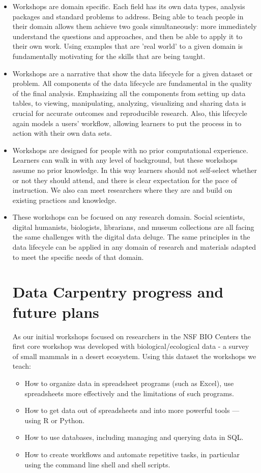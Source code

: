 \documentclass[15]{idcc}
\begin{document}
\begin{itemize}
\item Workshops are domain specific. Each field has its own data types, analysis packages and standard problems to address.
Being able to teach people in their domain allows them achieve two goals simultaneously:  more immediately understand the questions and approaches, and then
be able to apply it to their own work. Using examples that are 'real world' to a given domain is fundamentally motivating for
the skills that are being taught.

\item Workshops are a narrative that show the data lifecycle for a given dataset or problem. All components of the data lifecycle
are fundamental in the quality of the final analysis. Emphasizing all the components from setting up data tables, to viewing,
manipulating, analyzing, visualizing and sharing data is crucial for accurate outcomes and reproducible research. Also, this
lifecycle again models a users' workflow, allowing learners to put the process in to action with their own data sets.

\item Workshops are designed for people with no prior computational experience. Learners can walk in with any level of background,
but these workshops assume no prior knowledge. In this way learners should not self-select whether or not they should attend, and
there is clear expectation for the pace of instruction. We also can meet researchers where they are and build on existing practices
and knowledge.

\item These workshops can be focused on any research domain. Social scientists, digital humanists, biologists, librarians,
and museum collections are all facing the same challenges with the digital data deluge. The same principles in the data lifecycle
can be applied in any domain of research and materials adapted to meet the specific needs of that domain.

\section{Data Carpentry progress and future plans}

As our initial workshops focused on researchers in the NSF BIO Centers the first core workshop was developed with
biological/ecological data - a survey of small mammals in a desert ecosystem. Using this dataset the workshops we teach:
\begin{itemize}
\item How to organize data in spreadsheet programs (such as Excel), use spreadsheets more effectively and the limitations of such programs.
\item How to get data out of spreadsheets and into more powerful tools --- using R or Python.
\item How to use databases, including managing and querying data in SQL.
\item How to create workflows and automate repetitive tasks, in particular using the command line shell and shell scripts.
\end{itemize}


\end{itemize}
\end{document}

